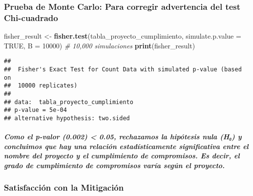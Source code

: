 \documentclass[
]{article}
\newenvironment{Shaded}{\begin{snugshade}}{\end{snugshade}}
\newcommand{\AttributeTok}[1]{\textcolor[rgb]{0.13,0.29,0.53}{#1}}
\newcommand{\CommentTok}[1]{\textcolor[rgb]{0.56,0.35,0.01}{\textit{#1}}}
\newcommand{\ConstantTok}[1]{\textcolor[rgb]{0.56,0.35,0.01}{#1}}
\newcommand{\DecValTok}[1]{\textcolor[rgb]{0.00,0.00,0.81}{#1}}
\newcommand{\FunctionTok}[1]{\textcolor[rgb]{0.13,0.29,0.53}{\textbf{#1}}}
\newcommand{\NormalTok}[1]{#1}
\newcommand{\OtherTok}[1]{\textcolor[rgb]{0.56,0.35,0.01}{#1}}
\begin{document}
\subsubsection{\texorpdfstring{\textbf{Prueba de Monte Carlo}: Para
corregir advertencia del test
Chi-cuadrado}{Prueba de Monte Carlo: Para corregir advertencia del test Chi-cuadrado}}\label{prueba-de-monte-carlo-para-corregir-advertencia-del-test-chi-cuadrado}

\begin{Shaded}
\begin{Highlighting}[]
\NormalTok{fisher\_result }\OtherTok{\textless{}{-}} \FunctionTok{fisher.test}\NormalTok{(tabla\_proyecto\_cumplimiento, }\AttributeTok{simulate.p.value =} \ConstantTok{TRUE}\NormalTok{, }\AttributeTok{B =} \DecValTok{10000}\NormalTok{)  }\CommentTok{\# 10,000 simulaciones}
\FunctionTok{print}\NormalTok{(fisher\_result)}
\end{Highlighting}
\end{Shaded}

\begin{verbatim}
## 
##  Fisher's Exact Test for Count Data with simulated p-value (based on
##  10000 replicates)
## 
## data:  tabla_proyecto_cumplimiento
## p-value = 5e-04
## alternative hypothesis: two.sided
\end{verbatim}

\subparagraph{\texorpdfstring{\emph{Como el p-valor (0.002) \textless{}
0.05, rechazamos la hipótesis nula (H₀) y concluimos que hay una
relación estadísticamente significativa entre el nombre del proyecto y
el cumplimiento de compromisos. Es decir, el grado de cumplimiento de
compromisos varía según el
proyecto.}}{Como el p-valor (0.002) \textless{} 0.05, rechazamos la hipótesis nula (H₀) y concluimos que hay una relación estadísticamente significativa entre el nombre del proyecto y el cumplimiento de compromisos. Es decir, el grado de cumplimiento de compromisos varía según el proyecto.}}\label{como-el-p-valor-0.002-0.05-rechazamos-la-hipuxf3tesis-nula-hux2080-y-concluimos-que-hay-una-relaciuxf3n-estaduxedsticamente-significativa-entre-el-nombre-del-proyecto-y-el-cumplimiento-de-compromisos.-es-decir-el-grado-de-cumplimiento-de-compromisos-varuxeda-seguxfan-el-proyecto.}

\subsubsection{\texorpdfstring{\textbf{Satisfacción con la
Mitigación}}{Satisfacción con la Mitigación}}\label{satisfacciuxf3n-con-la-mitigaciuxf3n}
\end{document}
